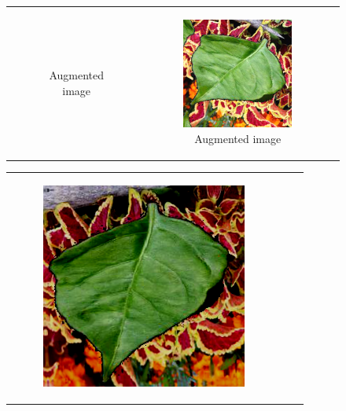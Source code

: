 \documentclass{BachelorBUI}
\begin{document}
\begin{figure}[h]
\begin{tabular}{ccc}
\begin{subfigure}{0.30\textwidth}
                    \caption{\centering Augmented image}
                \end{subfigure} &
                \begin{subfigure}{0.30\textwidth}
                    \centering
                    \includegraphics[width=\textwidth]{2_pipeline.png}
                    \caption{\centering Augmented image}
                \end{subfigure} \\
            \end{tabular}
            \begin{tabular}{ccc}
                \begin{subfigure}{0.30\textwidth}
                    \centering
                    \includegraphics[width=\textwidth]{3_pipeline.png}

\end{subfigure}
\end{tabular}
\end{figure}
\end{document}
